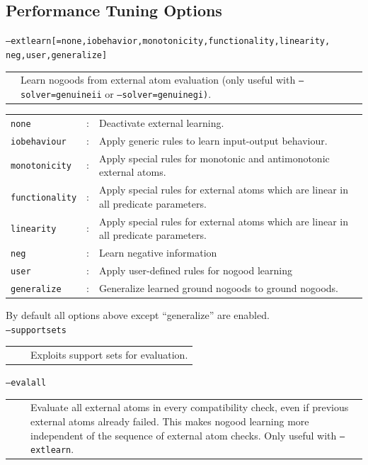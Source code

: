 \documentclass[14pt,a4paper, titlepage]{article}
\begin{document}
\subsection{Performance Tuning Options}
\texttt{--extlearn[=none,iobehavior,monotonicity,functionality,linearity,\\neg,user,generalize]}
\begin{center}
\begin{tabular}{p{3cm}  p{7.8cm}} 
 & Learn nogoods from external atom evaluation (only useful with \texttt{--solver=genuineii} or \texttt{--solver=genuinegi)}.\\
\end{tabular}
\end{center}
\begin{center}
\begin{tabular}{p{2.5cm}  p{0.5cm} p{7.8cm}  } 
\texttt{none}&:& Deactivate external learning. \\
\texttt{iobehaviour}&:&Apply generic rules to learn input-output behaviour. \\
\texttt{monotonicity}&:&Apply special rules for monotonic and antimonotonic external atoms.\\
\texttt{functionality}&:&Apply special rules for external atoms which are linear in all predicate parameters.\\
\texttt{linearity}&:&Apply special rules for external atoms which are linear in all predicate parameters.\\
\texttt{neg}&:&Learn negative information\\
\texttt{user}&:&Apply user-defined rules for nogood learning\\
\texttt{generalize}&:&Generalize learned ground nogoods to ground nogoods.\\
\end{tabular}
\end{center}
By default all options above except ``generalize'' are enabled.
\bigskip \\
\texttt{--supportsets}
\begin{center}
\begin{tabular}{p{3cm} p{0.2cm} p{7.8cm}}
&&Exploits support sets for evaluation.\\
\end{tabular}
\end{center}
\bigskip
\texttt{--evalall}
\begin{center}
\begin{tabular}{p{3cm} p{0.2cm} p{7.8cm}}
&&Evaluate all external atoms in every compatibility check, even if previous external atoms already failed.  This makes nogood learning more independent of the sequence of external atom checks. Only useful with \texttt{--extlearn}.\\
\end{tabular}
\end{center}
\end{document}

